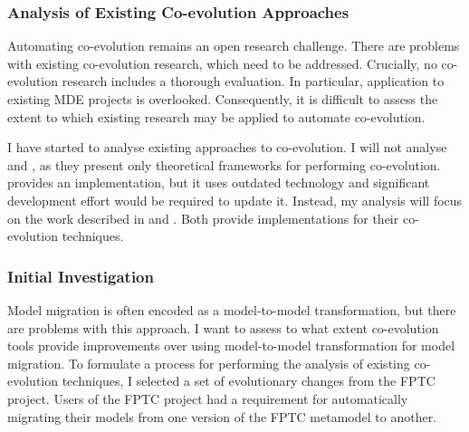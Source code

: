 

\subsubsection{Analysis of Existing Co-evolution Approaches}
Automating co-evolution remains an open research challenge. There are problems with existing co-evolution research, which need to be addressed. Crucially, no co-evolution research includes a thorough evaluation. In particular, application to existing MDE projects is overlooked. Consequently, it is difficult to assess the extent to which existing research may be applied to automate co-evolution. 

I have started to analyse existing approaches to co-evolution. I will not analyse \cite{wachsmuth07metamodel} and \cite{gruschko07towards}, as they present only theoretical frameworks for performing co-evolution. \cite{sprinkle04domain} provides an implementation, but it uses outdated technology and significant development effort would be required to update it. Instead, my analysis will focus on the work described in \cite{herrmannsdoerfer08cope} and \cite{cicchetti08automating}. Both provide implementations for their co-evolution techniques.

\subsubsection{Initial Investigation}
\label{subsubs:intial_investigation}
Model migration is often encoded as a model-to-model transformation, but there are problems with this approach. I want to assess to what extent co-evolution tools provide improvements over using model-to-model transformation for model migration. To formulate a process for performing the analysis of existing co-evolution techniques, I selected a set of evolutionary changes from the FPTC project. Users of the FPTC project had a requirement for automatically migrating their models from one version of the FPTC metamodel to another.

